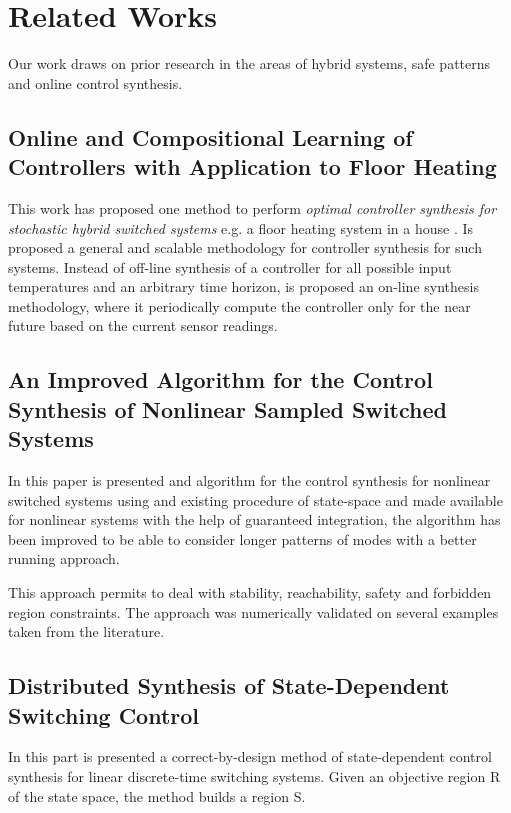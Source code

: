 
\chapter{Related Works}
\label{ch:relatedWorks}

Our work draws on prior research in the areas of hybrid systems, safe patterns
and online control synthesis.
\clearpage

\section{Online and Compositional Learning of Controllers with Application to Floor Heating}
This work has proposed one method to perform 
\textit{optimal controller synthesis for stochastic hybrid switched systems} e.g. a 
floor heating system in a house \cite{larsen2016online}. Is proposed a general
 and scalable methodology for controller synthesis for such systems. Instead of
  off-line synthesis of a controller for all possible input temperatures and an
   arbitrary time horizon, is proposed an on-line synthesis methodology, where 
   it periodically compute the controller only for the near future based on the
    current sensor readings.

\section{An Improved Algorithm for the Control Synthesis
of Nonlinear Sampled Switched Systems}
In this paper is presented and algorithm for the control synthesis for
 nonlinear switched systems using and existing procedure of state-space 
 and made available for nonlinear systems with the help of guaranteed 
 integration, the algorithm has been improved to be able to consider longer 
 patterns of modes with a better running approach. 

This approach permits to deal with stability, reachability, 
safety and forbidden region constraints. The approach was numerically validated
 on several examples taken from the literature.\cite{le2017improved}


\section{Distributed Synthesis of State-Dependent
Switching Control}
In this part is presented a correct-by-design method of state-dependent control
 synthesis for linear discrete-time switching systems. Given an objective region 
 R of the state space, the method builds a region S. \cite{le2016distributed}



